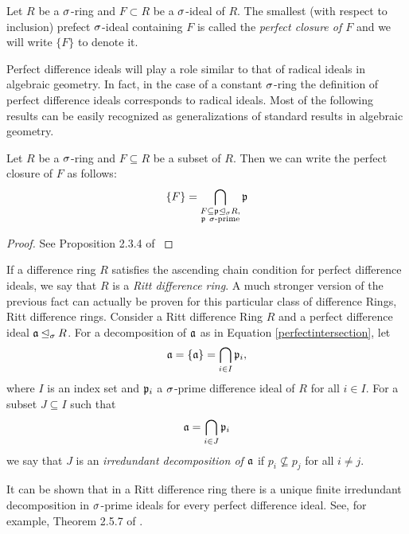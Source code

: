 \begin{defn}
Let $R$ be a $\sigma$-ring and $F \subset R$ be a $\sigma$-ideal of $R$. The smallest (with respect to inclusion) prefect $\sigma$-ideal containing $F$ is called the \emph{perfect closure of $F$} and we will write $\{F\}$ to denote it. 
\end{defn}

Perfect difference ideals will play a role similar to that of radical ideals in algebraic geometry. In fact, in the case of a constant $\sigma$-ring the definition of perfect difference ideals corresponds to radical ideals. Most of the following results can be easily recognized as generalizations of standard results in algebraic geometry. 

\begin{theorem}\label{intersectionperfect}
Let $R$ be a $\sigma$-ring and $F \subseteq R$ be a subset of $R$. Then we can write the perfect closure of $F$ as follows:
\begin{equation}\label{perfectintersection} \{F\} = \bigcap_{\substack{F \subseteq \mathfrak{p} \unlhd_{\sigma} R, \\ \mathfrak{p} ~ \sigma\text{-prime}}} \mathfrak{p} \end{equation}
\begin{proof} See Proposition 2.3.4 of \cite{levin} \end{proof}
\end{theorem}

If a difference ring $R$ satisfies the ascending chain condition for perfect difference ideals, we say that $R$ is a \emph{Ritt difference ring}.
A much stronger version of the previous fact can actually be proven for this  particular class of difference Rings, Ritt difference rings.  Consider a Ritt difference Ring $R$ and a perfect difference ideal $\mathfrak{a} \unlhd_{\sigma} R$. 
For a decomposition of $\mathfrak{a}$ as in Equation \ref{perfectintersection}, let $$\mathfrak{a} = \{ \mathfrak{a} \} = \bigcap_{i \in I} \mathfrak{p}_i,$$ where $I$ is an index set and $\mathfrak{p}_i$ a $\sigma$-prime difference ideal of $R$ for all $i \in I$.
For a subset $J \subseteq I$ such that $$ \mathfrak{a} = \bigcap_{i \in J} \mathfrak{p}_i$$ we say that $J$ is an \emph{irredundant decomposition of $\mathfrak{a}$}
if $p_i \not \subseteq p_j$ for all $i \neq j.$

It can be shown that in a Ritt difference ring there is a unique finite irredundant decomposition in $\sigma$-prime ideals for every perfect difference ideal. See, for example, Theorem 2.5.7 of \cite{levin}. 

